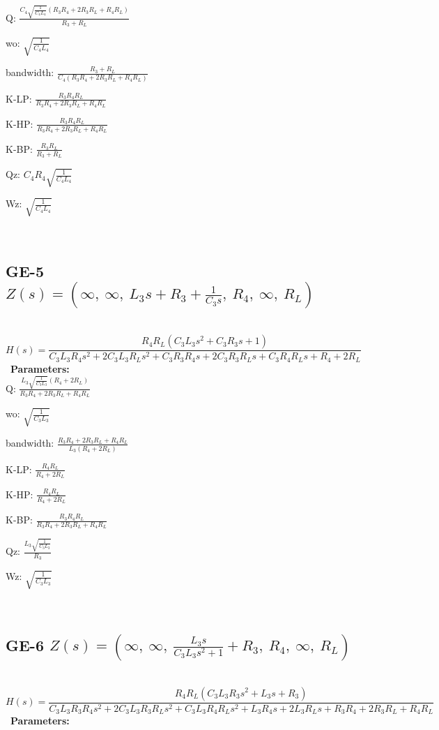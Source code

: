 \documentclass{article}
\begin{document}
Q: $\frac{C_{4} \sqrt{\frac{1}{C_{4} L_{4}}} \left(R_{3} R_{4} + 2 R_{3} R_{L} + R_{4} R_{L}\right)}{R_{3} + R_{L}}$\ 

wo: $\sqrt{\frac{1}{C_{4} L_{4}}}$\ 

bandwidth: $\frac{R_{3} + R_{L}}{C_{4} \left(R_{3} R_{4} + 2 R_{3} R_{L} + R_{4} R_{L}\right)}$\ 

K-LP: $\frac{R_{3} R_{4} R_{L}}{R_{3} R_{4} + 2 R_{3} R_{L} + R_{4} R_{L}}$\ 

K-HP: $\frac{R_{3} R_{4} R_{L}}{R_{3} R_{4} + 2 R_{3} R_{L} + R_{4} R_{L}}$\ 

K-BP: $\frac{R_{3} R_{L}}{R_{3} + R_{L}}$\ 

Qz: $C_{4} R_{4} \sqrt{\frac{1}{C_{4} L_{4}}}$\ 

Wz: $\sqrt{\frac{1}{C_{4} L_{4}}}$\ 

\ 

\subsection{GE-5 $Z(s) = \left( \infty, \  \infty, \  L_{3} s + R_{3} + \frac{1}{C_{3} s}, \  R_{4}, \  \infty, \  R_{L}\right)$ } \ 
\textbf{\[H(s) = \frac{R_{4} R_{L} \left(C_{3} L_{3} s^{2} + C_{3} R_{3} s + 1\right)}{C_{3} L_{3} R_{4} s^{2} + 2 C_{3} L_{3} R_{L} s^{2} + C_{3} R_{3} R_{4} s + 2 C_{3} R_{3} R_{L} s + C_{3} R_{4} R_{L} s + R_{4} + 2 R_{L}}\] } \ 
\textbf{Parameters:}\\ 

Q: $\frac{L_{3} \sqrt{\frac{1}{C_{3} L_{3}}} \left(R_{4} + 2 R_{L}\right)}{R_{3} R_{4} + 2 R_{3} R_{L} + R_{4} R_{L}}$\ 

wo: $\sqrt{\frac{1}{C_{3} L_{3}}}$\ 

bandwidth: $\frac{R_{3} R_{4} + 2 R_{3} R_{L} + R_{4} R_{L}}{L_{3} \left(R_{4} + 2 R_{L}\right)}$\ 

K-LP: $\frac{R_{4} R_{L}}{R_{4} + 2 R_{L}}$\ 

K-HP: $\frac{R_{4} R_{L}}{R_{4} + 2 R_{L}}$\ 

K-BP: $\frac{R_{3} R_{4} R_{L}}{R_{3} R_{4} + 2 R_{3} R_{L} + R_{4} R_{L}}$\ 

Qz: $\frac{L_{3} \sqrt{\frac{1}{C_{3} L_{3}}}}{R_{3}}$\ 

Wz: $\sqrt{\frac{1}{C_{3} L_{3}}}$\ 

\ 

\subsection{GE-6 $Z(s) = \left( \infty, \  \infty, \  \frac{L_{3} s}{C_{3} L_{3} s^{2} + 1} + R_{3}, \  R_{4}, \  \infty, \  R_{L}\right)$ } \ 
\textbf{\[H(s) = \frac{R_{4} R_{L} \left(C_{3} L_{3} R_{3} s^{2} + L_{3} s + R_{3}\right)}{C_{3} L_{3} R_{3} R_{4} s^{2} + 2 C_{3} L_{3} R_{3} R_{L} s^{2} + C_{3} L_{3} R_{4} R_{L} s^{2} + L_{3} R_{4} s + 2 L_{3} R_{L} s + R_{3} R_{4} + 2 R_{3} R_{L} + R_{4} R_{L}}\] } \ 
\textbf{Parameters:}\\ 
\end{document}
